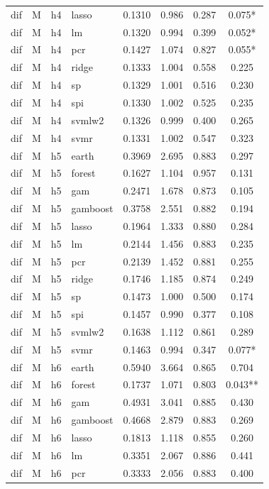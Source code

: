 \begin{ThreePartTable}
\begin{longtable}[t]{llclcccc}
dif & M & h4 & lasso & 0.1310 & 0.986 & 0.287 & 0.075*\\
dif & M & h4 & lm & 0.1320 & 0.994 & 0.399 & 0.052*\\
dif & M & h4 & pcr & 0.1427 & 1.074 & 0.827 & 0.055*\\
dif & M & h4 & ridge & 0.1333 & 1.004 & 0.558 & 0.225\\
dif & M & h4 & sp & 0.1329 & 1.001 & 0.516 & 0.230\\
dif & M & h4 & spi & 0.1330 & 1.002 & 0.525 & 0.235\\
dif & M & h4 & svmlw2 & 0.1326 & 0.999 & 0.400 & 0.265\\
dif & M & h4 & svmr & 0.1331 & 1.002 & 0.547 & 0.323\\
\addlinespace
dif & M & h5 & earth & 0.3969 & 2.695 & 0.883 & 0.297\\
dif & M & h5 & forest & 0.1627 & 1.104 & 0.957 & 0.131\\
dif & M & h5 & gam & 0.2471 & 1.678 & 0.873 & 0.105\\
dif & M & h5 & gamboost & 0.3758 & 2.551 & 0.882 & 0.194\\
dif & M & h5 & lasso & 0.1964 & 1.333 & 0.880 & 0.284\\
dif & M & h5 & lm & 0.2144 & 1.456 & 0.883 & 0.235\\
dif & M & h5 & pcr & 0.2139 & 1.452 & 0.881 & 0.255\\
dif & M & h5 & ridge & 0.1746 & 1.185 & 0.874 & 0.249\\
dif & M & h5 & sp & 0.1473 & 1.000 & 0.500 & 0.174\\
dif & M & h5 & spi & 0.1457 & 0.990 & 0.377 & 0.108\\
dif & M & h5 & svmlw2 & 0.1638 & 1.112 & 0.861 & 0.289\\
dif & M & h5 & svmr & 0.1463 & 0.994 & 0.347 & 0.077*\\
\addlinespace
dif & M & h6 & earth & 0.5940 & 3.664 & 0.865 & 0.704\\
dif & M & h6 & forest & 0.1737 & 1.071 & 0.803 & 0.043**\\
dif & M & h6 & gam & 0.4931 & 3.041 & 0.885 & 0.430\\
dif & M & h6 & gamboost & 0.4668 & 2.879 & 0.883 & 0.269\\
dif & M & h6 & lasso & 0.1813 & 1.118 & 0.855 & 0.260\\
dif & M & h6 & lm & 0.3351 & 2.067 & 0.886 & 0.441\\
dif & M & h6 & pcr & 0.3333 & 2.056 & 0.883 & 0.400\\

\end{longtable}
\end{ThreePartTable}
